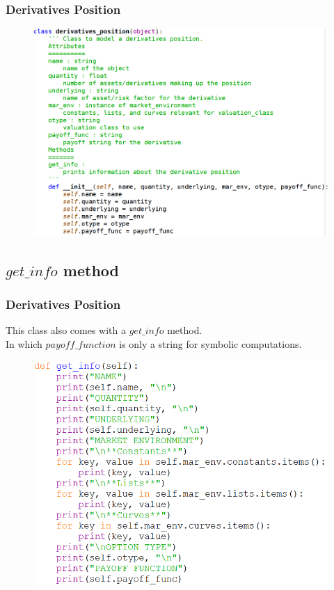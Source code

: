 \documentclass{beamer}
\begin{document}
\begin{frame}
\frametitle{Derivatives Position}
\begin{figure}[H]
	\includegraphics[scale=0.44]{derivatives_position_class.png}
\end{figure}
\end{frame}

\subsection{$get\_info$ method}
\begin{frame}
\frametitle{Derivatives Position}
This class also comes with a $get\_info$ method.\\
In which $payoff\_function$ is only a string for symbolic computations.
\begin{figure}[H]
	\includegraphics[scale=0.44]{derivatives_position_get_info.png}
\end{figure}
\end{frame}
\end{document}
